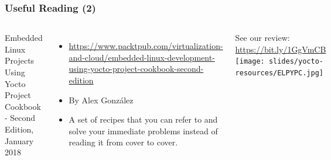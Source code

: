 \begin{frame}
  \frametitle{Useful Reading (2)}
  \begin{columns}
    Embedded Linux Projects Using Yocto Project Cookbook - Second Edition, January 2018
    \begin{itemize}
    \item \url{https://www.packtpub.com/virtualization-and-cloud/embedded-linux-development-using-yocto-project-cookbook-second-edition}
    \item By Alex González
    \item A set of recipes that you can refer to and solve your
          immediate problems instead of reading it from cover to cover. 
    \end{itemize}
    See our review: \url{https://bit.ly/1GgVmCB}
    \texttt{[image: slides/yocto-resources/ELPYPC.jpg]}
  \end{columns}
\end{frame}
